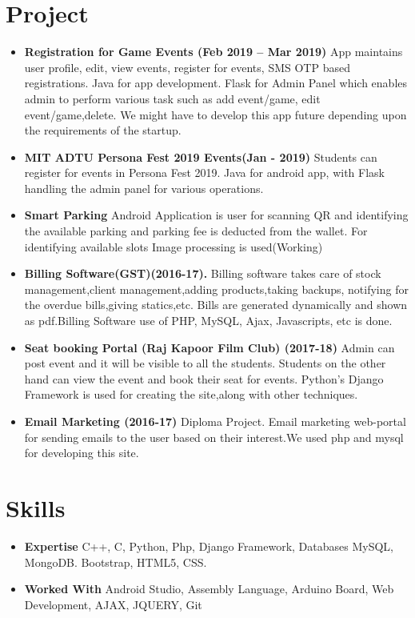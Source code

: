 \documentclass[letterpaper,11pt]{article}
\newcommand{\resumeItem}[2]{
  \item\small{
    \textbf{#1}{ #2 \vspace{-2pt}}
  }
}
\newcommand{\resumeSubItem}[2]{\resumeItem{#1}{#2}\vspace{-4pt}}
\newcommand{\resumeSubHeadingListStart}{\begin{itemize}[leftmargin=*]}
\newcommand{\resumeSubHeadingListEnd}{\end{itemize}}
\newcommand{\resumeItemListEnd}{\end{itemize}\vspace{-5pt}}
\begin{document}
\section{Project}
  \resumeSubHeadingListStart
        \resumeItem{Registration for Game Events (Feb 2019 – Mar 2019)}
          {App maintains user profile, edit, view events, register for events, SMS OTP based registrations. Java for app development. Flask for Admin Panel which enables admin to perform various task such as add event/game, edit event/game,delete. We might have to develop this app future depending upon the requirements of the startup.}
        \resumeItem{MIT ADTU Persona Fest 2019 Events(Jan - 2019)}
          {Students can register for events in Persona Fest 2019. Java for android app, with Flask handling the admin panel for various operations.}
          \resumeItem{Smart Parking}
          {Android Application is user for scanning QR and identifying the available parking and parking fee is deducted from the wallet. For identifying available slots Image processing is used(Working)}
          \resumeItem{Billing Software(GST)(2016-17).}
          {Billing software takes care of stock management,client management,adding products,taking backups, notifying for the overdue bills,giving statics,etc. Bills are generated dynamically and shown as pdf.Billing Software use of PHP, MySQL, Ajax, Javascripts, etc is done.}
        \resumeItem{Seat booking Portal (Raj Kapoor Film Club) (2017-18)}
          {Admin can post event and it will be visible to all the students. Students on the other hand can view the event and book their seat for events. Python's Django Framework is used for creating the site,along with other techniques.}
         \resumeItem{Email Marketing (2016-17)}
          {Diploma Project. Email marketing web-portal for sending emails to the user based on their interest.We used php and mysql for developing this site.}
          
      \resumeItemListEnd



\section{Skills}
  \resumeSubHeadingListStart
    \resumeSubItem{Expertise}
      {C++, C, Python, Php, Django Framework, Databases MySQL, MongoDB. Bootstrap, HTML5, CSS.}
    \resumeSubItem{Worked With}
      {Android Studio, Assembly Language, Arduino Board, Web Development, AJAX, JQUERY, Git}
  \resumeSubHeadingListEnd
  
\end{document}
